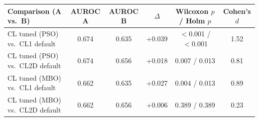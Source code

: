 \begin{tabular}{lccccc}
\toprule
Comparison (A vs.\ B) & AUROC A & AUROC B & $\Delta$ & Wilcoxon $p$ / Holm $p$ & Cohen's $d$ \\
\midrule
CL tuned (PSO) vs.\ CL1 default & 0.674 & 0.635 & +0.039 & $<$0.001 / $<$0.001 & 1.52 \\
CL tuned (PSO) vs.\ CL2D default & 0.674 & 0.656 & +0.018 & 0.007 / 0.013 & 0.81 \\
CL tuned (MBO) vs.\ CL1 default & 0.662 & 0.635 & +0.027 & 0.004 / 0.013 & 0.89 \\
CL tuned (MBO) vs.\ CL2D default & 0.662 & 0.656 & +0.006 & 0.389 / 0.389 & 0.23 \\
\bottomrule
\end{tabular}